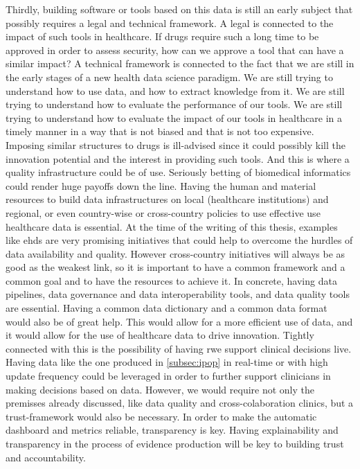 Thirdly, building software or tools based on this data is still an early subject that possibly requires a legal and technical framework. A legal is connected to the impact of such tools in healthcare. If drugs require such a long time to be approved in order to assess security, how can we approve a tool that can have a similar impact? A technical framework is connected to the fact that we are still in the early stages of a new health data science paradigm. We are still trying to understand how to use data, and how to extract knowledge from it. We are still trying to understand how to evaluate the performance of our tools.  We are still trying to understand how to evaluate the impact of our tools in healthcare in a timely manner in a way that is not biased and that is not too expensive. Imposing similar structures to drugs is ill-advised since it could possibly kill the innovation potential and the interest in providing such tools. And this is where a quality infrastructure could be of use. Seriously betting of biomedical informatics could render huge payoffs down the line. Having the human and material resources to build data infrastructures on local (healthcare institutions) and regional, or even country-wise or cross-country policies to use effective use healthcare data is essential. At the time of the writing of this thesis, examples like \ac{ehds} are very promising initiatives that could help to overcome the hurdles of data availability and quality. However cross-country initiatives will always be as good as the weakest link, so it is important to have a common framework and a common goal and to have the resources to achieve it. In concrete, having data pipelines, data governance and data interoperability tools, and data quality tools are essential. Having a common data dictionary and a common data format would also be of great help. This would allow for a more efficient use of data, and it would allow for the use of healthcare data to drive innovation.
Tightly connected with this is the possibility of having \ac{rwe} support clinical decisions live. Having data like the one produced in \ref{subsec:ipop} in real-time or with high update frequency could be leveraged in order to further support clinicians in making decisions based on data. However, we would require not only the premisses already discussed, like data quality and cross-colaboration clinics, but a trust-framework would also be necessary. In order to make the automatic dashboard and metrics reliable, transparency is key. Having explainability and transparency in the process of evidence production will be key to building trust and accountability.

